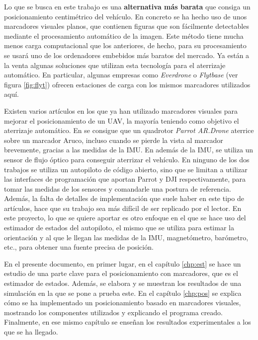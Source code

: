 Lo que se busca en este trabajo es una \textbf{alternativa más barata} que consiga un posicionamiento centimétrico del vehículo. En concreto se ha hecho uso de unos marcadores visuales planos, que contienen figuras que son fácilmente detectables mediante el procesamiento automático de la imagen. Este método tiene mucha menos carga computacional que los anteriores, de hecho, para su procesamiento se usará uno de los ordenadores embebidos más baratos del mercado.
Ya están a la venta algunas soluciones que utilizan esta tecnología para el aterrizaje automático. En particular, algunas  empresas como \textit{Everdrone} \cite{everdrone} o \textit{Flytbase} (ver figura \ref{fig:flyt}) ofrecen estaciones de carga con los mismos marcadores utilizados aquí. 

Existen varios artículos en los que ya han utilizado marcadores visuales para mejorar el posicionamiento de un UAV, la mayoría teniendo como objetivo el aterrizaje automático. En \cite{sani2017automatic} se consigue que un quadrotor \textit{Parrot AR.Drone} aterrice sobre un marcador Aruco, incluso cuando se pierde la vista al marcador brevemente, gracias a las medidas de la IMU. En \cite{yang2015precise} además de la IMU, se utiliza un sensor de flujo óptico para conseguir aterrizar el vehículo. En ninguno de los dos trabajos se utiliza un autopiloto de código abierto, sino que se limitan a utilizar las interfaces de programación que aportan Parrot y DJI respectivamente, para tomar las medidas de los sensores y comandarle una postura de referencia. 
Además, la falta de detalles de implementación que suele haber en este tipo de artículos, hace que su trabajo sea más difícil de ser replicado por el lector.
En este proyecto, lo que se quiere aportar es otro enfoque en el que se hace uso del estimador de estados del autopiloto, el mismo que se utiliza para estimar la orientación y al que le llegan las medidas de la IMU, magnetómetro, barómetro, etc., para obtener una fuente precisa de posición.  

En el presente documento, en primer lugar, en el capítulo \ref{chp:est} se hace un estudio de una parte clave para el posicionamiento con marcadores, que es el estimador de estados. Además, se elabora y se muestran los resultados de una simulación en la que se pone a prueba este. En el capítulo \ref{chp:pos} se explica cómo se ha implementado un posicionamiento basado en marcadores visuales, mostrando los componentes utilizados y explicando el programa creado. Finalmente, en ese mismo capítulo se enseñan los resultados experimentales a los que se ha llegado.  




\endinput

